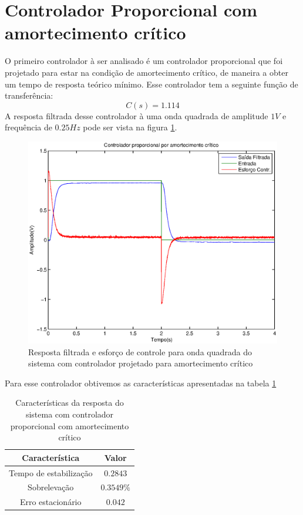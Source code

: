 \documentclass{article}
\begin{document}
\section{Controlador Proporcional com amortecimento crítico}
O primeiro controlador à ser analisado é um controlador proporcional que foi projetado para estar na condição de amortecimento crítico, de maneira a obter um tempo de resposta teórico mínimo. Esse controlador tem a seguinte função de transferência:
\begin{equation}
\label{eq:pidcrit}
C(s) = 1.114
\end{equation}
A resposta filtrada desse controlador à uma onda quadrada de amplitude $1 V$ e frequência de $0.25 Hz$ pode ser vista na figura \ref{fig:ypidc}.
 \begin{figure}[H]
 	\centering
 	\includegraphics[width=0.8\linewidth]{yupidc}
 	\caption{Resposta filtrada e esforço de controle para onda quadrada do sistema com controlador projetado para amortecimento crítico}
 	\label{fig:ypidc}
 \end{figure}
Para esse controlador obtivemos as características apresentadas na tabela \ref{tab:pidc}
\begin{table}[H]
	\centering
	\caption{Características da resposta do sistema com controlador proporcional com amortecimento crítico}
	\label{tab:pidc}
	\begin{tabular}{|c|c|}
		\hline Característica & Valor \\ 
		\hline Tempo de estabilização & $0.2843$\\  
		\hline Sobrelevação & $0.3549\%$\\ 
		\hline Erro estacionário & $0.042$\\ 
		\hline 
	\end{tabular} 
\end{table}
\end{document}
